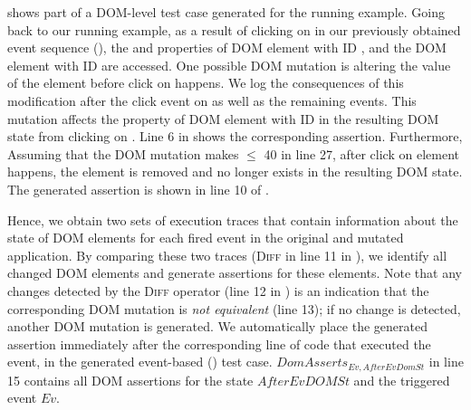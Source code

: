  shows part of a DOM-level test case generated for the running example.
Going back to our running example, as a result of clicking on  in our previously obtained event sequence (),
the  and  properties of DOM element with ID , and the DOM element with ID  are accessed. One possible DOM mutation is altering the  value of the  element before click on  happens. %
We log the consequences of this modification after the click event on  as well as the remaining events.
This mutation affects the  property of DOM element with ID  in the resulting DOM state from clicking on . Line 6 in  shows the corresponding assertion.
Furthermore, Assuming that the DOM mutation makes $\leq$ 40 in line 27, after click on element  happens, the element is removed and no longer exists in the resulting DOM state. The generated assertion is shown in line 10 of . 




Hence, we obtain two sets of execution traces that contain information about the state of DOM elements for each fired event in the original and mutated application. By comparing these two traces (\textsc{Diff} in line 11 in ), we identify all changed DOM elements and generate assertions for these elements. 
Note that  any changes detected by the \textsc{Diff} operator (line 12 in ) is an indication that the corresponding DOM mutation is \emph{not equivalent} (line 13); if no change is detected, another DOM mutation is generated. 
We automatically place the generated assertion immediately after the corresponding line of code that executed the event, in the generated event-based (\selenium) test case. $DomAsserts_{Ev,AfterEvDomSt}$ in line 15 contains all DOM assertions for the state $AfterEvDOMSt$ and the triggered event $Ev$.
  
